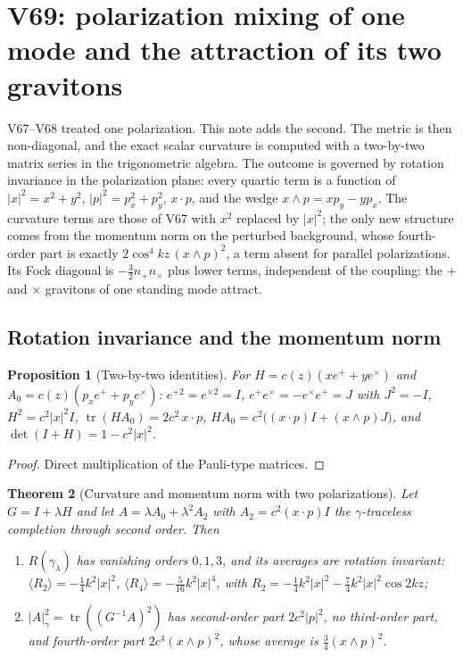\documentclass[11pt]{article}
\newtheorem{theorem}{Theorem}[section]
\newtheorem{proposition}[theorem]{Proposition}
\theoremstyle{remark}
\begin{document}
\section{V69: polarization mixing of one mode and the attraction of its two gravitons}
\label{sec:v19v69}

V67--V68 treated one polarization.  This note adds the second.  The
metric is then non-diagonal, and the exact scalar curvature is computed
with a two-by-two matrix series in the trigonometric algebra.  The
outcome is governed by rotation invariance in the polarization plane:
every quartic term is a function of \(|x|^2=x^2+y^2\),
\(|p|^2=p_x^2+p_y^2\), \(x\cdot p\), and the wedge \(x\wedge p=xp_y-yp_x\).
The curvature terms are those of V67 with \(x^2\) replaced by
\(|x|^2\); the only new structure comes from the momentum norm on the
perturbed background, whose fourth-order part is exactly
\(2\cos^4kz\,(x\wedge p)^2\), a term absent for parallel polarizations.
Its Fock diagonal is \(-\tfrac32n_+n_\times\) plus lower terms,
independent of the coupling: the \(+\) and \(\times\) gravitons of one
standing mode attract.

\subsection{Rotation invariance and the momentum norm}

\begin{proposition}[Two-by-two identities]
\label{prop:v19v69-identities}
For \(H=c(z)(xe^++ye^\times)\) and \(A_0=c(z)(p_xe^++p_ye^\times)\):
\(e^{+2}=e^{\times2}=I\), \(e^+e^\times=-e^\times e^+=J\) with
\(J^2=-I\), \(H^2=c^2|x|^2I\), \(\operatorname{tr}(HA_0)=2c^2\,x\cdot p\),
\(HA_0=c^2\bigl((x\cdot p)I+(x\wedge p)J\bigr)\), and
\(\det(I+H)=1-c^2|x|^2\).
\end{proposition}

\begin{proof}
Direct multiplication of the Pauli-type matrices.
\end{proof}

\begin{theorem}[Curvature and momentum norm with two polarizations]
\label{thm:v19v69-norm}
Let \(G=I+\lambda H\) and let \(A=\lambda A_0+\lambda^2A_2\) with
\(A_2=c^2(x\cdot p)I\) the \(\gamma\)-traceless completion through
second order.  Then
\begin{enumerate}
\item \(R(\gamma_\lambda)\) has vanishing orders \(0,1,3\), and its
      averages are rotation invariant:
      \(\langle R_2\rangle=-\tfrac14k^2|x|^2\),
      \(\langle R_4\rangle=-\tfrac5{16}k^2|x|^4\), with
      \(R_2=-\tfrac14k^2|x|^2-\tfrac74k^2|x|^2\cos2kz\);
\item \(|A|_\gamma^2=\operatorname{tr}((G^{-1}A)^2)\) has second-order
      part \(2c^2|p|^2\), no third-order part, and fourth-order part
      \(2c^4(x\wedge p)^2\), whose average is \(\tfrac34(x\wedge p)^2\).
\end{enumerate}
\end{theorem}
\end{document}
